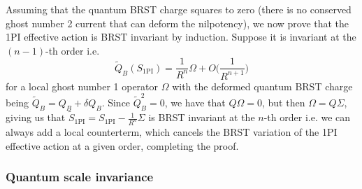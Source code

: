 \documentclass[12pt]{article}
\def\be{\begin{equation}}
\def\ee{\end{equation}}
\numberwithin{equation}{section}
\begin{document}
Assuming that the quantum BRST charge squares to zero (there is no conserved ghost number 2 current that can deform the nilpotency), we now prove that the 1PI effective action is BRST invariant by induction. Suppose it is invariant at the $(n-1)$-th order i.e.
\be
\tilde{Q}_B(S_{\text{1PI}}) = \frac{1}{R^n} \Omega + O\Big(\frac{1}{R^{n+1}}\Big)
\ee
for a local ghost number 1 operator $\Omega$ with the deformed quantum BRST charge being $\tilde{Q}_B = Q_B + \delta Q_B$. Since $\tilde{Q}_B^2 = 0$, we have that $Q\Omega = 0$, but then $\Omega = Q \Sigma$, giving us that $\tilde{S}_{\text{1PI}} = S_{\text{1PI}} - \frac{1}{R^n} \Sigma$ is BRST invariant at the $n$-th order i.e. we can always add a local counterterm, which cancels the BRST variation of the 1PI effective action at a given order, completing the proof.

\subsubsection{Quantum scale invariance}
\end{document}
